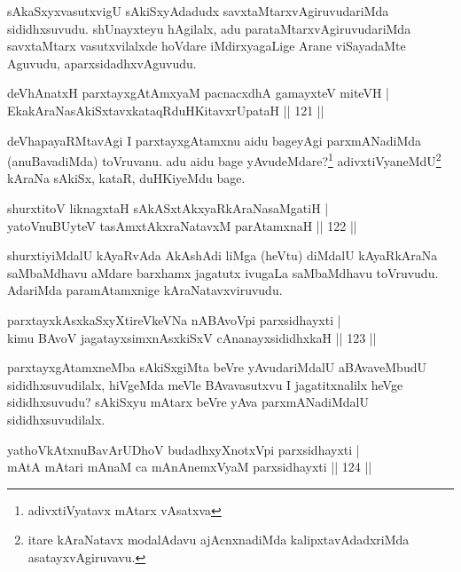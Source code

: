 \begin{artha}
sAkaSxyxvasutxvigU sAkiSxyAdadudx savxtaMtarxvAgiruvudariMda sididhxsuvudu. shUnayxteyu hAgilalx, adu parataMtarxvAgiruvudariMda savxtaMtarx vasutxvilalxde hoVdare iMdirxyagaLige Arane viSayadaMte Aguvudu, aparxsidadhxvAguvudu.
\end{artha}

\begin{shl}
deVhAnatxH parxtayxgAtAmx\s yaM pacnacxdhA gamayxteV miteVH |\\
EkakAraNasAkiSxtavxkataqRduHKitavxrUpataH \hfill || 121 ||
\end{shl}

\begin{artha}
deVhapayaRMtavAgi I parxtayxgAtamxnu aidu bageyAgi parxmANadiMda (anuBavadiMda) toVruvanu. adu aidu bage yAvudeMdare?\footnote{adivxtiVyatavx mAtarx vAsatxva} adivxtiVyaneMdU\footnote{itare kAraNatavx modalAdavu ajAcnxnadiMda kalipxtavAdadxriMda asatayxvAgiruvavu.} kAraNa sAkiSx, kataR, duHKiyeMdu bage.
\end{artha}


\begin{shl}
shurxtitoV liknagxtaH sAkASxtAkxyaRkAraNasaMgatiH |\\
yatoV\s nuBUyteV tasAmxtAkxraNatavxM parAtamxnaH \hfill || 122 ||
\end{shl}

\begin{artha}
shurxtiyiMdalU kAyaRvAda AkAshAdi liMga (heVtu) diMdalU kAyaRkAraNa saMbaMdhavu aMdare barxhamx jagatutx ivugaLa saMbaMdhavu toVruvudu. AdariMda paramAtamxnige kAraNatavxviruvudu.
\end{artha}

\begin{shl}
parxtayxkAsxkaSxyXtireVkeVNa nABAvoV\s pi parxsidhayxti |\\
kimu BAvoV jagatayxsimxnAsxkiSxV cAnanayxsididhxkaH \hfill || 123 ||
\end{shl}

\begin{artha}
parxtayxgAtamxneMba sAkiSxgiMta beVre yAvudariMdalU aBAva\-\break veMbudU sididhxsuvudilalx, hiVgeMda meVle BAvavasutxvu I jagatitxnalilx heVge sididhxsuvudu? sAkiSxyu mAtarx beVre yAva parxmANadiMdalU sididhxsuvudilalx.
\end{artha}

\begin{shl}
yathoVkAtxnuBavArUDhoV budadhxyXnotxV\s pi parxsidhayxti |\\
mAtA mAtari mAnaM ca mAnAnemxVyaM parxsidhayxti \hfill || 124 ||
\end{shl}

